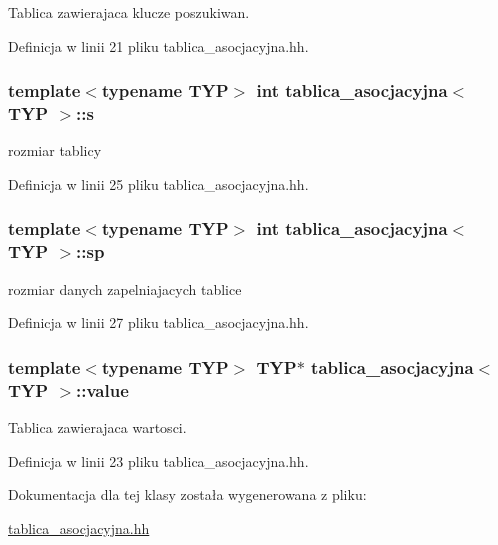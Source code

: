 Tablica zawierajaca klucze poszukiwan. 



Definicja w linii 21 pliku tablica\-\_\-asocjacyjna.\-hh.

\hypertarget{classtablica__asocjacyjna_a4a9d8aa0a03fd1ccf2fa7980d61bc197}{
\subsubsection[{s}]{\setlength{\rightskip}{0pt plus 5cm}template$<$typename T\-Y\-P$>$ int {\bf tablica\-\_\-asocjacyjna}$<$ T\-Y\-P $>$\-::s\hspace{0.3cm}{\ttfamily [private]}}}\label{classtablica__asocjacyjna_a4a9d8aa0a03fd1ccf2fa7980d61bc197}


rozmiar tablicy 



Definicja w linii 25 pliku tablica\-\_\-asocjacyjna.\-hh.

\hypertarget{classtablica__asocjacyjna_a2af0a8be0f335f5ad09f908cb08c0039}{
\subsubsection[{sp}]{\setlength{\rightskip}{0pt plus 5cm}template$<$typename T\-Y\-P$>$ int {\bf tablica\-\_\-asocjacyjna}$<$ T\-Y\-P $>$\-::sp\hspace{0.3cm}{\ttfamily [private]}}}\label{classtablica__asocjacyjna_a2af0a8be0f335f5ad09f908cb08c0039}


rozmiar danych zapelniajacych tablice 



Definicja w linii 27 pliku tablica\-\_\-asocjacyjna.\-hh.

\hypertarget{classtablica__asocjacyjna_a28719743b86b0a16db652afda20b665c}{
\subsubsection[{value}]{\setlength{\rightskip}{0pt plus 5cm}template$<$typename T\-Y\-P$>$ T\-Y\-P$\ast$ {\bf tablica\-\_\-asocjacyjna}$<$ T\-Y\-P $>$\-::value\hspace{0.3cm}{\ttfamily [private]}}}\label{classtablica__asocjacyjna_a28719743b86b0a16db652afda20b665c}


Tablica zawierajaca wartosci. 



Definicja w linii 23 pliku tablica\-\_\-asocjacyjna.\-hh.



Dokumentacja dla tej klasy została wygenerowana z pliku\-:\begin{DoxyCompactItemize}
\item 
\hyperlink{tablica__asocjacyjna_8hh}{tablica\-\_\-asocjacyjna.\-hh}\end{DoxyCompactItemize}
